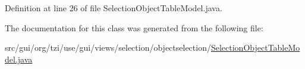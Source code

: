 Definition at line 26 of file Selection\-Object\-Table\-Model.\-java.



The documentation for this class was generated from the following file\-:\begin{DoxyCompactItemize}
\item 
src/gui/org/tzi/use/gui/views/selection/objectselection/\hyperlink{_selection_object_table_model_8java}{Selection\-Object\-Table\-Model.\-java}\end{DoxyCompactItemize}
